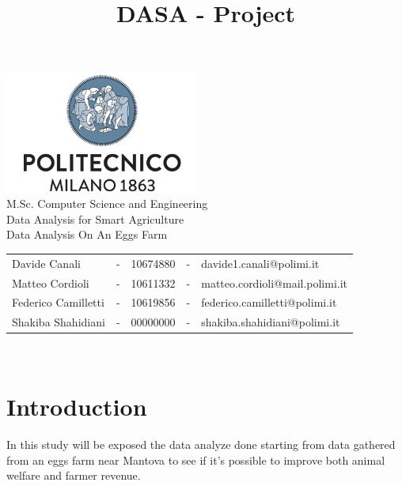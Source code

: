\documentclass[11pt]{article}
\title{DASA - Project}
\begin{document}
\setlength{\parskip}{1em}

\begin{titlepage}
\centering
\vfill
{
\includegraphics[width =\linewidth, height = 4cm, keepaspectratio]{PolitecnicoLogo.png}
\label{fig:PolitecnicoLogo}
\large \\[2ex]M.Sc. Computer Science and Engineering\\
\large Data Analysis for Smart Agriculture\\[12ex]
\huge
Data Analysis On An Eggs Farm\\[1.5ex]
\large
\vspace{10mm}

\vspace{15mm}
\normalsize

\vspace{30mm}

\begin{tabular}{lclcl}
    Davide Canali & - & 10674880 & - & davide1.canali@polimi.it\\
    Matteo Cordioli & - & 10611332 & - & matteo.cordioli@mail.polimi.it\\
    Federico Camilletti & - & 10619856 & - & federico.camilletti@polimi.it\\
    Shakiba Shahidiani  & - & 00000000 & - & shakiba.shahidiani@polimi.it\\
\end{tabular}

\vspace{30mm}

\@date\\[2.5ex]
}
\end{titlepage}

\makeatother
\tableofcontents
\newpage

\section{Introduction}
In this study will be exposed the data analyze done starting from data gathered from an eggs farm near Mantova to see if it's possible to improve both animal welfare and farmer revenue.
\end{document}
